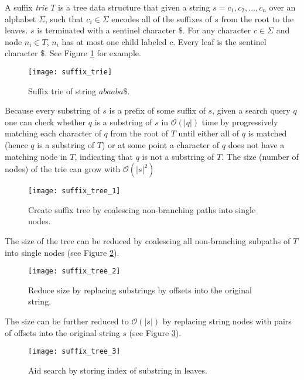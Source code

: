 A suffix \emph{trie} $T$ is a tree data structure that given a string $s=c_1,c_2,...,c_n$ over an alphabet $\Sigma$, such that $c_i \in \Sigma$ encodes all of the suffixes of $s$ from the root to the leaves. $s$ is terminated with a sentinel character $\$$. For any character $c \in \Sigma$ and node $n_i \in T$, $n_i$ has at most one child labeled $c$. Every leaf is the sentinel character $\$$. See Figure \ref{fig:suffix_trie} for example.

\begin{figure}[H]
    \texttt{[image: suffix\_trie]}
    \centering
    \caption {Suffix trie of string $abaaba\$$.\autocite{langmead_teaching}}
    \label{fig:suffix_trie}
\end{figure}

Because every substring of $s$ is a prefix of some suffix of $s$, given a search query $q$ one can check whether $q$ is a substring of $s$ in $\mathcal{O}(|q|)$ time by progressively matching each character of $q$ from the root of $T$ until either all of $q$ is matched (hence $q$ is a substring of $T$) or at some point a character of $q$ does not have a matching node in $T$, indicating that $q$ is not a substring of $T$. The size (number of nodes) of the trie can grow with $\mathcal{O}(|s|^2)$  

\begin{figure}[H]
    \texttt{[image: suffix\_tree\_1]}
    \centering
    \caption {Create suffix tree by coalescing non-branching paths into single nodes.\autocite{langmead_teaching}}
    \label{fig:suffix_tree_1}
\end{figure}

The size of the tree can be reduced by coalescing all non-branching subpaths of $T$ into single nodes (see Figure \ref{fig:suffix_tree_1}). 

\begin{figure}[H]
    \texttt{[image: suffix\_tree\_2]}
    \centering
    \caption {Reduce size by replacing substrings by offsets into the original string.\autocite{langmead_teaching}}
    \label{fig:suffix_tree_2}
\end{figure}

The size can be further reduced to $\mathcal{O}(|s|)$ by replacing string nodes with pairs of offsets into the original string $s$ (see Figure \ref{fig:suffix_tree_2}).

\begin{figure}[H]
    \texttt{[image: suffix\_tree\_3]}
    \centering
    \caption {Aid search by storing index of substring in leaves.\autocite{langmead_teaching}}
    \label{fig:suffix_tree_3}
\end{figure}

